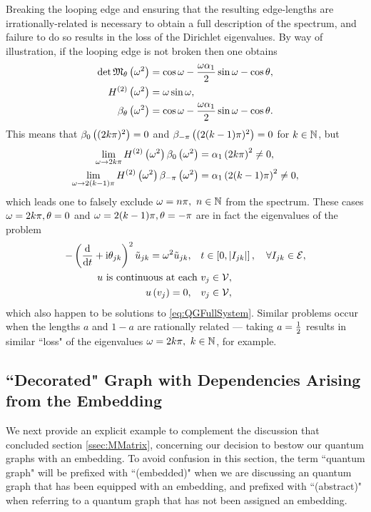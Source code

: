Breaking the looping edge and ensuring that the resulting edge-lengths are irrationally-related is necessary to obtain a full description of the spectrum, and failure to do so results in the loss of the Dirichlet eigenvalues.
By way of illustration, if the looping edge is not broken then one obtains
\begin{align*}
	\det\mathfrak{M}_{\theta}\left( \omega^2 \right) &= \cos\omega - \frac{\omega\alpha_1}{2}\sin\omega - \cos\theta, \\
	H^{(2)}\left( \omega^2 \right) &= \omega\sin\omega, \\
	\beta_{\theta}\left( \omega^2 \right) &= \cos\omega - \frac{\omega\alpha_1}{2}\sin\omega - \cos\theta.
\end{align*}
This means that $\beta_{0}\left( (2k\pi)^2 \right)=0$ and $\beta_{-\pi}\left( (2(k-1)\pi)^2 \right)=0$ for $k\in\mathbb{N}$, but 
\begin{align*}
	\lim_{\omega\rightarrow 2k\pi}H^{(2)}\left( \omega^2 \right)\beta_{0}\left( \omega^2 \right) &= \alpha_1\left( 2k\pi \right)^2 \neq 0, \\
	\lim_{\omega\rightarrow 2(k-1)\pi} H^{(2)}\left( \omega^2 \right)\beta_{-\pi}\left( \omega^2 \right) &= \alpha_1\left( 2(k-1)\pi \right)^2 \neq 0,
\end{align*}
which leads one to falsely exclude $\omega=n\pi, \ n\in\mathbb{N}$ from the spectrum.
These cases $\omega=2k\pi, \theta=0$ and $\omega=2(k-1)\pi, \theta=-\pi$ are in fact the eigenvalues of the problem
\begin{align*}
	-\left( \dfrac{\mathrm{d}}{\mathrm{d}t} + \mathrm{i}\theta_{jk} \right)^2 \tilde{u}_{jk} = \omega^2 \tilde{u}_{jk}, \quad &t\in\left[ 0,\left\lvert I_{jk} \right\rvert \right], \quad \forall I_{jk}\in \mathcal{E}, \\
	u \text{ is continuous at each } &v_j \in \mathcal{V}, \\
	u\left( v_j \right) = 0, \quad &v_j\in\mathcal{V},
\end{align*}
which also happen to be solutions to \eqref{eq:QGFullSystem}.
Similar problems occur when the lengths $a$ and $1-a$ are rationally related --- taking $a=\frac{1}{2}$ results in similar ``loss" of the eigenvalues $\omega=2k\pi, \ k\in\naturals$, for example.

\subsection{``Decorated" Graph with Dependencies Arising from the Embedding} \label{ssec:EmbeddingDependentExample}
We next provide an explicit example to complement the discussion that concluded section \ref{ssec:MMatrix}, concerning our decision to bestow our quantum graphs with an embedding. 
To avoid confusion in this section, the term ``quantum graph" will be prefixed with ``(embedded)" when we are discussing an quantum graph that has been equipped with an embedding, and prefixed with ``(abstract)" when referring to a quantum graph that has not been assigned an embedding.

